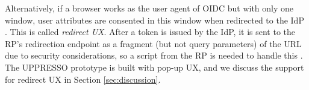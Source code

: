 
Alternatively, if a browser works as the user agent of OIDC but with only one window,
        user attributes are consented in this window when redirected to the IdP \cite{OpenIDConnect,rfc6749,GoogleIdIntegrate}.
        This is called \emph{redirect UX}.
After a token is issued by the IdP,
    it is sent to the RP's redirection endpoint as a fragment (but not query parameters) of the URL due to security considerations,
so a script from the RP is needed to handle this \cite{de2014oauth}.
The UPPRESSO prototype is built with pop-up UX,
    and we discuss the support for redirect UX in Section \ref{sec:discussion}.



